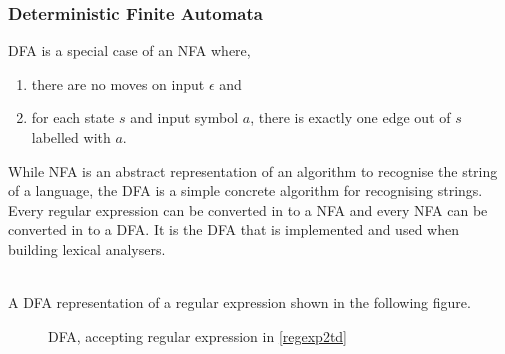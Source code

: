 \subsubsection{Deterministic Finite Automata}
DFA is a special case of an NFA where,
\begin{enumerate}
  \item there are no moves on input $\epsilon$ and
  \item for each state $s$ and input symbol $a$, there is exactly one edge out
        of $s$ labelled with $a$.
\end{enumerate}
While NFA is an abstract representation of an algorithm to recognise the string 
of a language, the DFA is a simple concrete algorithm for recognising strings. 
Every regular expression can be converted in to a NFA and every NFA can be 
converted in to a DFA. \cite{Aho2006} It is the DFA that is implemented and 
used when building lexical analysers. 
\begin{example} \label{regexp2dfa}
\cite{Aho2006}\\
A DFA representation of a regular expression shown in the following figure.
\begin{figure}[!h]
  \centering
  \label{fig:dfa}
  \caption{DFA, accepting regular expression in \cref{regexp2td}}
\end{figure}
\end{example}

 
